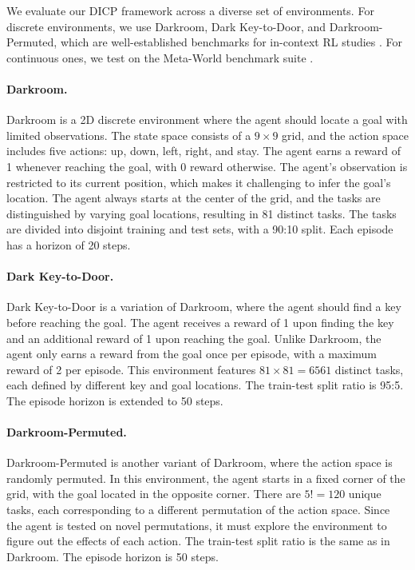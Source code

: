 \documentclass{article}
\begin{document}
We evaluate our DICP framework across a diverse set of environments.
For discrete environments, we use Darkroom, Dark Key-to-Door, and Darkroom-Permuted, which are well-established benchmarks for in-context RL studies \citep{AD, DPT, IDT}.
For continuous ones, we test on the Meta-World benchmark suite \citep{MW}.

\paragraph*{Darkroom.}
Darkroom is a 2D discrete environment where the agent should locate a goal with limited observations.
The state space consists of a $9 \times 9$ grid, and the action space includes five actions: up, down, left, right, and stay.
The agent earns a reward of 1 whenever reaching the goal, with 0 reward otherwise.
The agent's observation is restricted to its current position, which makes it challenging to infer the goal's location.
The agent always starts at the center of the grid, and the tasks are distinguished by varying goal locations, resulting in 81 distinct tasks.
The tasks are divided into disjoint training and test sets, with a 90:10 split.
Each episode has a horizon of 20 steps.

\paragraph*{Dark Key-to-Door.}
Dark Key-to-Door is a variation of Darkroom, where the agent should find a key before reaching the goal.
The agent receives a reward of 1 upon finding the key and an additional reward of 1 upon reaching the goal.
Unlike Darkroom, the agent only earns a reward from the goal once per episode, with a maximum reward of 2 per episode.
This environment features $81 \times 81 = 6561$ distinct tasks, each defined by different key and goal locations.
The train-test split ratio is 95:5.
The episode horizon is extended to 50 steps.

\paragraph*{Darkroom-Permuted.}
Darkroom-Permuted is another variant of Darkroom, where the action space is randomly permuted.
In this environment, the agent starts in a fixed corner of the grid, with the goal located in the opposite corner.
There are $5!=120$ unique tasks, each corresponding to a different permutation of the action space.
Since the agent is tested on novel permutations, it must explore the environment to figure out the effects of each action.
The train-test split ratio is the same as in Darkroom.
The episode horizon is 50 steps.
\end{document}
